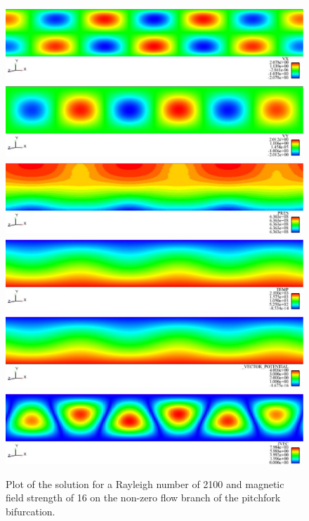 \documentclass[pdf,ps2pdf,11pt]{SANDreport}
\begin{document}
{\bsinglespace
\begin{figure}
\begin{center}
\includegraphics*[angle=0,scale=0.3]{figures/ms_vx.eps}
\includegraphics*[angle=0,scale=0.3]{figures/ms_vy.eps}
\includegraphics*[angle=0,scale=0.3]{figures/ms_pres.eps}
\includegraphics*[angle=0,scale=0.3]{figures/ms_temp.eps}
\includegraphics*[angle=0,scale=0.3]{figures/ms_vectorpotential.eps}
\includegraphics*[angle=0,scale=0.3]{figures/ms_current.eps}
\end{center}
\caption[Solution of the hydromagnetic Rayleigh-Bernard problem]{
\label{fig:hrbFlow}
Plot of the solution for a Rayleigh number of 2100 and magnetic field strength
of 16 on the non-zero flow branch of the pitchfork bifurcation.}
\end{figure}
\esinglespace}
 
\end{document}
